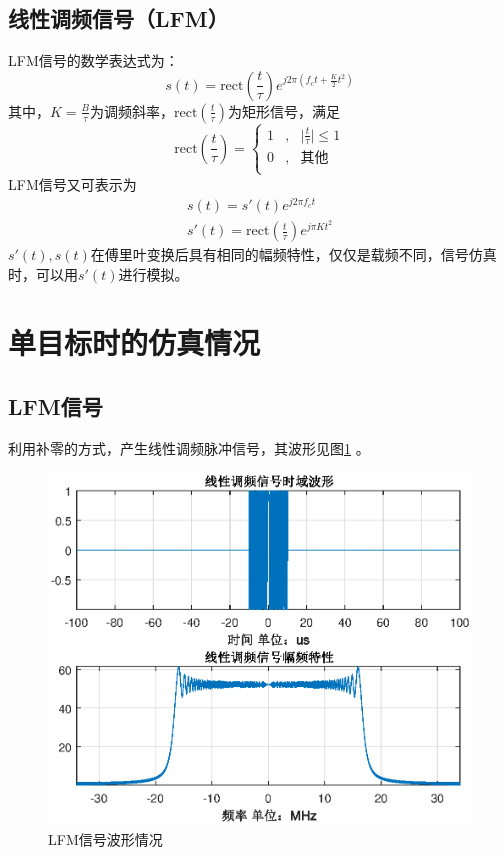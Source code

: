 \documentclass[12pt]{article}
\begin{document}
\subsection{线性调频信号（LFM）}
LFM信号的数学表达式为：
\begin{equation}\label{LFM1}
  s(t)=\mbox{rect}(\frac{t}{\tau})e^{j2\pi\left(f_ct+\frac{K}{2}t^2\right)}
\end{equation}
其中，$K=\frac{B}{\tau}$为调频斜率，$\mbox{rect}(\frac{t}{\tau})$为矩形信号，满足
\begin{equation}\label{juxing1}
\mbox{rect}(\frac{t}{\tau})=\left\{
  \begin{array}{ccc}
    1 &,&\vert \frac{t}{\tau}\vert \leq 1 \\
    0 &,& \mbox{其他} \\
  \end{array}
  \right.
\end{equation}
LFM信号又可表示为
\begin{equation}\label{wuzaipinLFM}
\begin{array}{c}
  s(t)=s'(t)e^{j2\pi f_ct}\\
  s'(t)=\mbox{rect}(\frac{t}{\tau})e^{j\pi Kt^2}
\end{array}
\end{equation}
$s'(t),s(t)$在傅里叶变换后具有相同的幅频特性，仅仅是载频不同，信号仿真时，可以用$s'(t)$进行模拟。\par
\section{单目标时的仿真情况}
\setcounter{table}{0}
\setcounter{figure}{0}
\setcounter{equation}{0}
\subsection{LFM信号}
利用补零的方式，产生线性调频脉冲信号，其波形见图\ref{LFM2}
。
\begin{figure}[htbp]
  \centering
  \includegraphics[width=\textwidth]{fasheboxing}
  \caption{LFM信号波形情况}\label{LFM2}
\end{figure}
\end{document}

